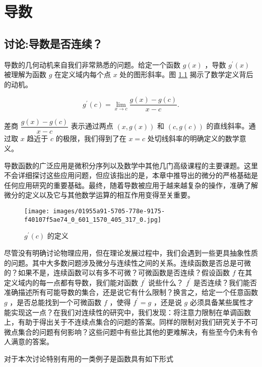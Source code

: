 \chapter{导数}
\label{chap:5}
\section{讨论:导数是否连续？}
\label{sec:5.1}
导数的几何动机来自我们非常熟悉的问题。给定一个函数 \(g\left( x\right)\) ，导数 \({g}^{\prime }\left( x\right)\) 被理解为函数 \(g\) 在定义域内每个点 \(x\) 处的图形斜率。图 \ref{fig:5.1} 揭示了数学定义背后的动机。

\[
{g}^{\prime }\left( c\right)  = \mathop{\lim }\limits_{{x \rightarrow  c}}\frac{g\left( x\right)  - g\left( c\right) }{x - c}.
\]

差商 $\dfrac{g(x) - g(c)}{x-c}$ 表示通过两点 \(\left( {x,g\left( x\right) }\right)\) 和 \(\left( {c,g\left( c\right) }\right)\) 的直线斜率。通过取 \(x\) 趋近于 \(c\) 的极限，我们得到了在 \(x = c\) 处切线斜率的明确定义的数学意义。

导数函数的广泛应用是微积分序列以及数学中其他几门高级课程的主要课题。这里不会详细探讨这些应用问题，但应该指出的是，本章中推导出的微分的严格基础是任何应用研究的重要基础。最终，随着导数被应用于越来越复杂的操作，准确了解微分的定义以及它与其他数学运算的相互作用变得至关重要。

\begin{figure}[b]
  \centering
  \texttt{[image: images/01955a91-5705-778e-9175-f40107f5ae74\_0\_601\_1570\_405\_317\_0.jpg]}
  \caption{\({g}^{\prime }\left( c\right)\) 的定义}
  \label{fig:5.1}
\end{figure}

尽管没有明确讨论物理应用，但在理论发展过程中，我们会遇到一些更具抽象性质的问题。其中大多数问题涉及微分与连续性之间的关系。连续函数是否总是可微的？如果不是，连续函数可以有多不可微？可微函数是否连续？假设函数 \(f\) 在其定义域内的每一点都有导数，我们能对函数 \({f}^{\prime }\) 说些什么？ \({f}^{\prime }\) 是否连续？我们能否准确描述所有可能导数的集合，还是说它有什么限制？换言之，给定一个任意函数 \(g\) ，是否总能找到一个可微函数 \(f\) ，使得 \({f}^{\prime } = g\) ，还是说 \(g\) 必须具备某些属性才能实现这一点？在我们对连续性的研究中，我们发现：将注意力限制在单调函数上，有助于得出关于不连续点集合的问题的答案。同样的限制对我们研究关于不可微点集合的问题有何影响？这些问题中有些比其他的更难解决，有些至今仍未有令人满意的答案。

对于本次讨论特别有用的一类例子是函数具有如下形式



